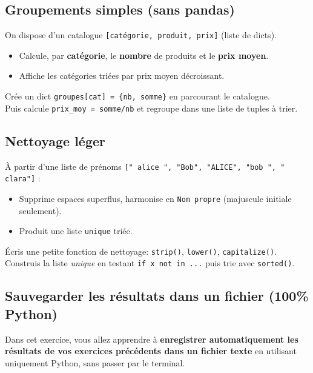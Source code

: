 \documentclass[11pt,a4paper]{article}
\begin{document}
\subsection*{Groupements simples (sans pandas)}
On dispose d'un catalogue \texttt{[{catégorie, produit, prix}]} (liste de dicts).
\begin{itemize}
    \item Calcule, par \textbf{catégorie}, le \textbf{nombre} de produits et le \textbf{prix moyen}.
    \item Affiche les catégories triées par prix moyen décroissant.
\end{itemize}
\begin{tcolorbox}[title=Aide]
Crée un dict \texttt{groupes[cat] = \{nb, somme\}} en parcourant le catalogue.\\
Puis calcule \texttt{prix\_moy = somme/nb} et regroupe dans une liste de tuples à trier.
\end{tcolorbox}

\subsection*{Nettoyage léger}
À partir d'une liste de prénoms \texttt{[" alice ", "Bob", "ALICE", "bob ", "  clara"]} :
\begin{itemize}
    \item Supprime espaces superflus, harmonise en \texttt{Nom propre} (majuscule initiale seulement).
    \item Produit une liste \texttt{unique} triée.
\end{itemize}
\begin{tcolorbox}[title=Aide]
Écris une petite fonction de nettoyage: \texttt{strip()}, \texttt{lower()}, \texttt{capitalize()}.\\
Construis la liste \emph{unique} en testant \texttt{if x not in ...} puis trie avec \texttt{sorted()}.
\end{tcolorbox}

\newpage

\subsection*{Sauvegarder les résultats dans un fichier (100\% Python)}

Dans cet exercice, vous allez apprendre à \textbf{enregistrer automatiquement les résultats de vos exercices précédents dans un fichier texte} en utilisant uniquement Python, sans passer par le terminal.
\end{document}
